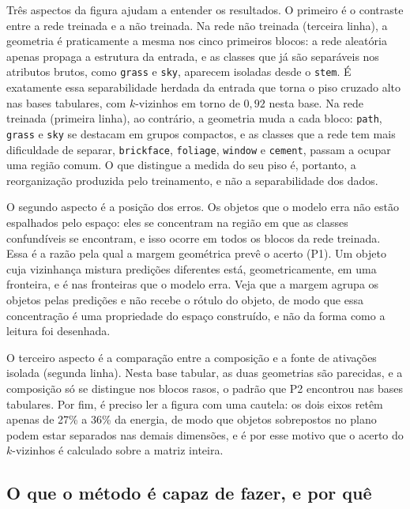 Três aspectos da figura ajudam a entender os resultados. O primeiro é o contraste entre a rede treinada e a não treinada. Na rede não treinada (terceira linha), a geometria é praticamente a mesma nos cinco primeiros blocos: a rede aleatória apenas propaga a estrutura da entrada, e as classes que já são separáveis nos atributos brutos, como \texttt{grass} e \texttt{sky}, aparecem isoladas desde o \texttt{stem}. É exatamente essa separabilidade herdada da entrada que torna o piso cruzado alto nas bases tabulares, com $k$-vizinhos em torno de $0{,}92$ nesta base. Na rede treinada (primeira linha), ao contrário, a geometria muda a cada bloco: \texttt{path}, \texttt{grass} e \texttt{sky} se destacam em grupos compactos, e as classes que a rede tem mais dificuldade de separar, \texttt{brickface}, \texttt{foliage}, \texttt{window} e \texttt{cement}, passam a ocupar uma região comum. O que distingue a medida do seu piso é, portanto, a reorganização produzida pelo treinamento, e não a separabilidade dos dados.

O segundo aspecto é a posição dos erros. Os objetos que o modelo erra não estão espalhados pelo espaço: eles se concentram na região em que as classes confundíveis se encontram, e isso ocorre em todos os blocos da rede treinada. Essa é a razão pela qual a margem geométrica prevê o acerto (P1). Um objeto cuja vizinhança mistura predições diferentes está, geometricamente, em uma fronteira, e é nas fronteiras que o modelo erra. Veja que a margem agrupa os objetos pelas predições e não recebe o rótulo do objeto, de modo que essa concentração é uma propriedade do espaço construído, e não da forma como a leitura foi desenhada.

O terceiro aspecto é a comparação entre a composição e a fonte de ativações isolada (segunda linha). Nesta base tabular, as duas geometrias são parecidas, e a composição só se distingue nos blocos rasos, o padrão que P2 encontrou nas bases tabulares. Por fim, é preciso ler a figura com uma cautela: os dois eixos retêm apenas de 27\% a 36\% da energia, de modo que objetos sobrepostos no plano podem estar separados nas demais dimensões, e é por esse motivo que o acerto do $k$-vizinhos é calculado sobre a matriz inteira.

\subsection{O que o método é capaz de fazer, e por quê}\label{subsec:res_instanciacao}


